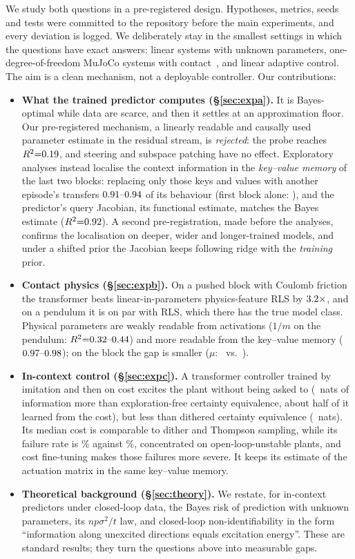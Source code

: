 We study both questions in a pre-registered design. Hypotheses, metrics, seeds and tests were committed to the
repository before the main experiments, and every deviation is logged. We deliberately stay in the smallest settings
in which the questions have exact answers: linear systems with unknown parameters, one-degree-of-freedom MuJoCo
systems with contact~\citep{todorov2012mujoco}, and linear adaptive control. The aim is a clean mechanism, not a
deployable controller. Our contributions:
\begin{itemize}
\item \textbf{What the trained predictor computes (\S\ref{sec:expa}).} It is Bayes-optimal while data are scarce, and
then it settles at an approximation floor. Our pre-registered mechanism, a linearly readable and causally used parameter
estimate in the residual stream, is \emph{rejected}: the probe reaches $R^2{=}0.19$, and steering and subspace patching
have no effect. Exploratory analyses instead localise the context information in the \emph{key--value memory} of the last
two blocks: replacing only those keys and values with another episode's transfers $0.91\mbox{--}0.94$ of its behaviour (first
block alone: \AkvOne), and the predictor's query Jacobian, its functional estimate, matches the Bayes estimate
($R^2{=}0.92$). A second pre-registration, made before the analyses, confirms the localisation on deeper, wider and
longer-trained models, and under a shifted prior the Jacobian keeps following ridge with the \emph{training} prior.
\item \textbf{Contact physics (\S\ref{sec:expb}).} On a pushed block with Coulomb friction the transformer beats
linear-in-parameters physics-feature RLS by $3.2\times$, and on a pendulum it is on par with RLS, which there has the true
model class. Physical parameters are weakly readable from activations ($1/m$ on the pendulum: $R^2{=}0.32\mbox{--}0.44$) and
more readable from the key--value memory ($0.97\mbox{--}0.98$); on the block the gap is smaller ($\mu$: \BfwKmu\ vs.\ \BresKmu).
\item \textbf{In-context control (\S\ref{sec:expc}).} A transformer controller trained by imitation and then on cost
excites the plant without being asked to (\Hfived\ nats of information more than exploration-free certainty equivalence,
about half of it learned from the cost), but less than dithered certainty equivalence (\CinfoCED\ nats). Its median cost
is comparable to dither and Thompson sampling, while its failure rate is \CTFfail\% against \CCEDfail\%, concentrated on
open-loop-unstable plants, and cost fine-tuning makes those failures more severe. It keeps its estimate of the actuation
matrix in the same key--value memory.
\item \textbf{Theoretical background (\S\ref{sec:theory}).} We restate, for in-context predictors under closed-loop data,
the Bayes risk of prediction with unknown parameters, its $np\sigma^2/t$ law, and closed-loop non-identifiability in
the form ``information along unexcited directions equals excitation energy''. These are standard results; they turn
the questions above into measurable gaps.
\end{itemize}

